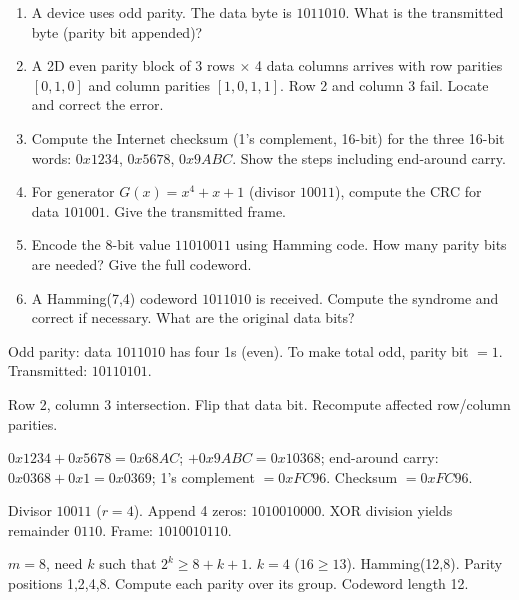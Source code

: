 \documentclass[11pt]{article}
\begin{document}
\begin{exercice}
\begin{enumerate}
\item A device uses odd parity. The data byte is $1011010$. What is the transmitted byte (parity bit appended)?
\item A 2D even parity block of 3 rows $\times$ 4 data columns arrives with row parities $[0,1,0]$ and column parities $[1,0,1,1]$. Row 2 and column 3 fail. Locate and correct the error.
\item Compute the Internet checksum (1's complement, 16-bit) for the three 16-bit words: $0x1234$, $0x5678$, $0x9ABC$. Show the steps including end-around carry.
\item For generator $G(x)=x^4+x+1$ (divisor $10011$), compute the CRC for data $101001$. Give the transmitted frame.
\item Encode the 8-bit value $11010011$ using Hamming code. How many parity bits are needed? Give the full codeword.
\item A Hamming(7,4) codeword $1011010$ is received. Compute the syndrome and correct if necessary. What are the original data bits?
\end{enumerate}
\end{exercice}

\begin{corrige}[Exercise 1]
Odd parity: data $1011010$ has four 1s (even). To make total odd, parity bit $= 1$. Transmitted: $10110101$.
\end{corrige}

\begin{corrige}[Exercise 2]
Row 2, column 3 intersection. Flip that data bit. Recompute affected row/column parities.
\end{corrige}

\begin{corrige}[Exercise 3]
$0x1234 + 0x5678 = 0x68AC$; $+ 0x9ABC = 0x10368$; end-around carry: $0x0368 + 0x1 = 0x0369$; 1's complement $= 0xFC96$. Checksum $= 0xFC96$.
\end{corrige}

\begin{corrige}[Exercise 4]
Divisor $10011$ ($r=4$). Append 4 zeros: $1010010000$. XOR division yields remainder $0110$. Frame: $1010010110$.
\end{corrige}

\begin{corrige}[Exercise 5]
$m=8$, need $k$ such that $2^k \ge 8+k+1$. $k=4$ ($16 \ge 13$). Hamming(12,8). Parity positions 1,2,4,8. Compute each parity over its group. Codeword length 12.
\end{corrige}
\end{document}
